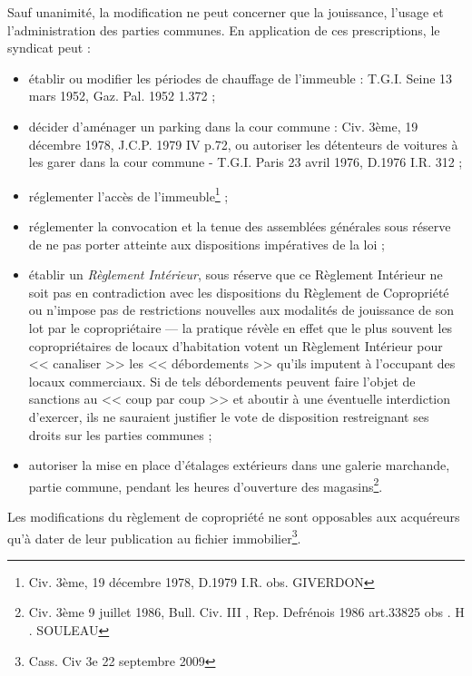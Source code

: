 			Sauf unanimité, la modification ne peut concerner que la jouissance, l'usage et l'administration des parties communes. En application de ces prescriptions, le syndicat peut :
			\begin{itemize}
				\item établir ou modifier les périodes de chauffage de l'immeuble : T.G.I. Seine 13 mars 1952, Gaz. Pal. 1952 1.372 ;
				
				\item décider d'aménager un parking dans la cour commune : Civ. 3ème, 19 décembre 1978, J.C.P. 1979 IV p.72, ou autoriser les détenteurs de voitures à les garer dans la cour commune - T.G.I. Paris 23 avril 1976, D.1976 I.R. 312 ;
				
				\item réglementer l'accès de l'immeuble\footnote{Civ. 3ème, 19 décembre 1978, D.1979 I.R. obs. GIVERDON} ;
				
				\item réglementer la convocation et la tenue des assemblées générales sous réserve de ne pas porter atteinte aux dispositions impératives de la loi ;
				
				\item établir un \emph{Règlement Intérieur}, sous réserve que ce Règlement Intérieur ne soit pas en contradiction avec les dispositions du Règlement de Copropriété ou n'impose pas de restrictions nouvelles aux modalités de jouissance de son lot par le copropriétaire --- la pratique révèle en effet que le plus souvent les copropriétaires de locaux d'habitation votent un Règlement Intérieur pour << canaliser >> les << débordements >> qu'ils imputent à l'occupant des locaux commerciaux. Si de tels débordements peuvent faire l'objet de sanctions au << coup par coup >> et aboutir à une éventuelle interdiction d'exercer, ils ne sauraient justifier le vote de disposition restreignant ses droits sur les parties communes ;
				
				\item autoriser la mise en place d'étalages extérieurs dans une galerie marchande, partie commune, pendant les heures d'ouverture des magasins\footnote{Civ. 3ème 9 juillet 1986, Bull. Civ. III , Rep. Defrénois 1986 art.33825 obs . H . SOULEAU}.
			\end{itemize}
			
			Les modifications du règlement de copropriété ne sont opposables aux acquéreurs qu’à dater de leur publication au fichier immobilier\footnote{Cass. Civ 3e 22 septembre 2009}.
		
